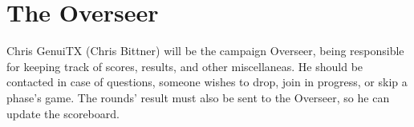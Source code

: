 \section{The Overseer}

Chris GenuiTX (Chris Bittner) will be the campaign Overseer, being responsible for keeping track of scores, results, and other miscellaneas. 
He should be contacted in case of questions, someone wishes to drop, join in progress, or skip a phase's game. 
The rounds' result must also be sent to the Overseer, so he can update the scoreboard.

